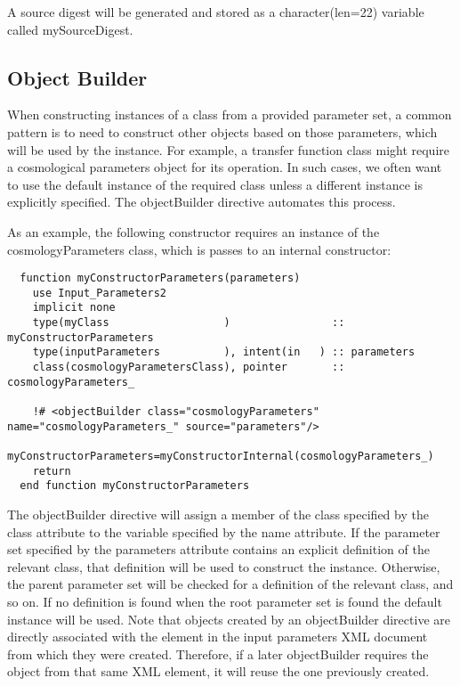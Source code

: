 A source digest will be generated and stored as a {\normalfont \ttfamily character(len=22)} variable called {\normalfont \ttfamily mySourceDigest}.

\subsection{Object Builder}

When constructing instances of a class from a provided parameter set, a common pattern is to need to construct other objects based on those parameters, which will be used by the instance. For example, a transfer function class might require a cosmological parameters object for its operation. In such cases, we often want to use the default instance of the required class unless a different instance is explicitly specified. The {\normalfont \ttfamily objectBuilder} directive automates this process.

As an example, the following constructor requires an instance of the {\normalfont \ttfamily cosmologyParameters} class, which is passes to an internal constructor:

\begin{lstlisting}  
  function myConstructorParameters(parameters)
    use Input_Parameters2
    implicit none
    type(myClass                  )                :: myConstructorParameters
    type(inputParameters          ), intent(in   ) :: parameters
    class(cosmologyParametersClass), pointer       :: cosmologyParameters_    

    !# <objectBuilder class="cosmologyParameters" name="cosmologyParameters_" source="parameters"/>
    myConstructorParameters=myConstructorInternal(cosmologyParameters_)
    return
  end function myConstructorParameters
\end{lstlisting}

The {\normalfont \ttfamily objectBuilder} directive will assign a member of the class specified by the {\normalfont \ttfamily class} attribute to the variable specified by the {\normalfont \ttfamily name} attribute. If the parameter set specified by the {\normalfont \ttfamily parameters} attribute contains an explicit definition of the relevant class, that definition will be used to construct the instance. Otherwise, the parent parameter set will be checked for a definition of the relevant class, and so on. If no definition is found when the root parameter set is found the default instance will be used. Note that objects created by an {\normalfont \ttfamily objectBuilder} directive are directly associated with the element in the input parameters XML document from which they were created. Therefore, if a later {\normalfont \ttfamily objectBuilder} requires the object from that same XML element, it will reuse the one previously created.

